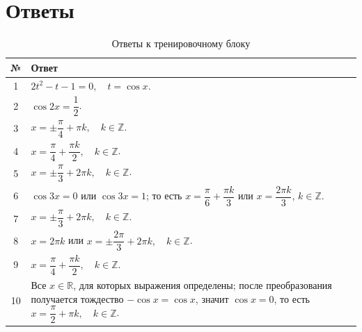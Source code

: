 \documentclass[a4paper,12pt]{article}
\newcommand{\sectionline}{\vspace{1mm}{\color{accent}\hrule height 0.6pt}\vspace{2mm}}
\newcommand{\Z}{\mathbb{Z}}
\begin{document}
\newpage

\section{Ответы}
\sectionline

\begin{table}[h]
\centering
\caption{Ответы к тренировочному блоку}
\begin{tabularx}{\linewidth}{cX}
\toprule
\textbf{№} & \textbf{Ответ} \\
\midrule
1 & \(2t^2-t-1=0,\quad t=\cos x\). \\
2 & \(\cos2x=\dfrac12\). \\
3 & \(x=\pm\dfrac{\pi}{4}+\pi k,\quad k\in\Z\). \\
4 & \(x=\dfrac{\pi}{4}+\dfrac{\pi k}{2},\quad k\in\Z\). \\
5 & \(x=\pm\dfrac{\pi}{3}+2\pi k,\quad k\in\Z\). \\
6 & \(\cos3x=0\) или \(\cos3x=1\); то есть \(x=\dfrac{\pi}{6}+\dfrac{\pi k}{3}\) или \(x=\dfrac{2\pi k}{3}\), \(k\in\Z\). \\
7 & \(x=\pm\dfrac{\pi}{3}+2\pi k,\quad k\in\Z\). \\
8 & \(x=2\pi k\) или \(x=\pm\dfrac{2\pi}{3}+2\pi k,\quad k\in\Z\). \\
9 & \(x=\dfrac{\pi}{4}+\dfrac{\pi k}{2},\quad k\in\Z\). \\
10 & Все \(x\in\mathbb R\), для которых выражения определены; после преобразования получается тождество \(-\cos x=\cos x\), значит \(\cos x=0\), то есть \(x=\dfrac{\pi}{2}+\pi k,\quad k\in\Z\). \\
\bottomrule
\end{tabularx}
\end{table}
\end{document}
